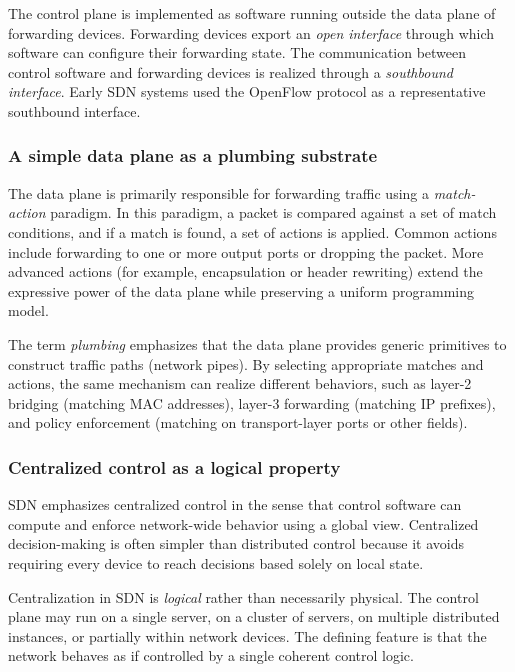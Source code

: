 \documentclass[11pt,a4paper,openany]{report}
\begin{document}
The control plane is implemented as software running outside the data plane of forwarding devices. Forwarding devices export an \emph{open interface} through which software can configure their forwarding state. The communication between control software and forwarding devices is realized through a \emph{southbound interface}. Early SDN systems used the OpenFlow protocol as a representative southbound interface.

\subsubsection*{A simple data plane as a plumbing substrate}

The data plane is primarily responsible for forwarding traffic using a \emph{match-action} paradigm. In this paradigm, a packet is compared against a set of match conditions, and if a match is found, a set of actions is applied. Common actions include forwarding to one or more output ports or dropping the packet. More advanced actions (for example, encapsulation or header rewriting) extend the expressive power of the data plane while preserving a uniform programming model.

The term \emph{plumbing} emphasizes that the data plane provides generic primitives to construct traffic paths (network pipes). By selecting appropriate matches and actions, the same mechanism can realize different behaviors, such as layer-2 bridging (matching MAC addresses), layer-3 forwarding (matching IP prefixes), and policy enforcement (matching on transport-layer ports or other fields).

\subsubsection*{Centralized control as a logical property}

SDN emphasizes centralized control in the sense that control software can compute and enforce network-wide behavior using a global view. Centralized decision-making is often simpler than distributed control because it avoids requiring every device to reach decisions based solely on local state.

Centralization in SDN is \emph{logical} rather than necessarily physical. The control plane may run on a single server, on a cluster of servers, on multiple distributed instances, or partially within network devices. The defining feature is that the network behaves as if controlled by a single coherent control logic.
\end{document}

